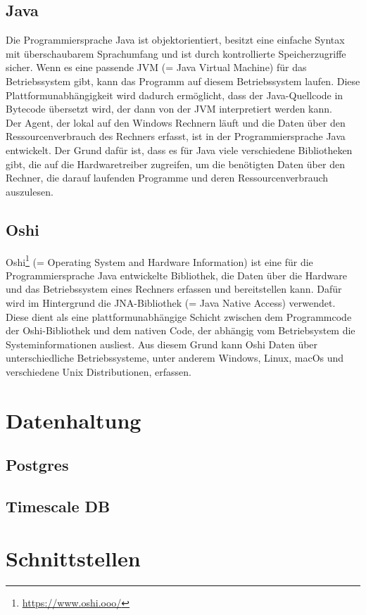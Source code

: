 \documentclass{report}
\begin{document}
\subsection{Java}
Die Programmiersprache Java ist objektorientiert, besitzt eine einfache Syntax mit überschaubarem Sprachumfang und ist durch kontrollierte Speicherzugriffe sicher. Wenn es eine passende JVM (= Java Virtual Machine) für das Betriebssystem gibt, kann das Programm auf diesem Betriebssystem laufen. Diese Plattformunabhängigkeit wird dadurch ermöglicht, dass der Java-Quellcode in Bytecode übersetzt wird, der dann von der JVM interpretiert werden kann.\\
Der Agent, der lokal auf den Windows Rechnern läuft und die Daten über den Ressourcenverbrauch des Rechners erfasst, ist in der Programmiersprache Java entwickelt. Der Grund dafür ist, dass es für Java viele verschiedene Bibliotheken gibt, die auf die Hardwaretreiber zugreifen, um die benötigten Daten über den Rechner, die darauf laufenden Programme und deren Ressourcenverbrauch auszulesen.

\subsection{Oshi}
Oshi\footnote{\url{https://www.oshi.ooo/}} (= Operating System and Hardware Information) ist eine für die Programmiersprache Java entwickelte Bibliothek, die Daten über die Hardware und das Betriebssystem eines Rechners erfassen und bereitstellen kann. Dafür wird im Hintergrund die JNA-Bibliothek (= Java Native Access) verwendet. Diese dient als eine plattformunabhängige Schicht zwischen dem Programmcode der Oshi-Bibliothek und dem nativen Code, der abhängig vom Betriebsystem die Systeminformationen ausliest. Aus diesem Grund kann Oshi Daten über unterschiedliche Betriebssysteme, unter anderem Windows, Linux, macOs und verschiedene Unix Distributionen, erfassen.

\section{Datenhaltung}
\subsection{Postgres}
\subsection{Timescale DB}

\section{Schnittstellen}
\end{document}

